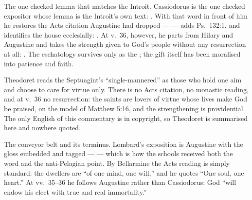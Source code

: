 \begin{witnessnote}
The one checked lemma that matches the Introit. Cassiodorus is the one checked
expositor whose lemma is the Introit's own text: . With that word in front of him he restores the Acts
citation Augustine had dropped ---  --- adds Ps.~132:1, and identifies the house
ecclesially: . At v.~36, however, he
parts from Hilary and Augustine and takes the strength given to God's people
without any resurrection at all: .
The eschatology survives only as the ; the gift itself has been
moralised into patience and faith.
\end{witnessnote}

\begin{witnessnote}
Theodoret reads the Septuagint's ``single-mannered'' as those who hold one aim
and choose to care for virtue only. There is no Acts citation, no monastic
reading, and at v.~36 no resurrection: the saints are lovers of virtue whose
lives make God be praised, on the model of Matthew 5:16, and the strengthening
is providential. The only English of this commentary is in copyright, so
Theodoret is summarised here and nowhere quoted.
\end{witnessnote}

\begin{witnessnote}
The conveyor belt and its terminus. Lombard's exposition is Augustine with the
gloss embedded and tagged ---  --- which is
how the schools received both the word and the anti-Pelagian point. By
Bellarmine the Acts reading is simply standard: the dwellers are ``of one mind,
one will,'' and he quotes ``One soul, one heart.'' At vv.~35--36 he follows
Augustine rather than Cassiodorus: God ``will endow his elect with true and
real immortality.''
\end{witnessnote}

